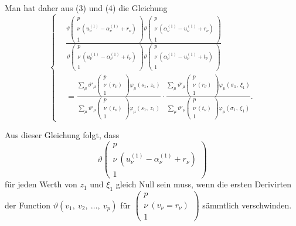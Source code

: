 \documentclass[12pt,a4paper]{book}
\theoremstyle{definition}
\theoremstyle{remark}
\begin{document}
Man hat daher aus (3) und (4) die Gleichung
\begin{equation}
\tag{5}
\left\{
\begin{aligned}
&\frac{\vartheta\left(\begin{array}{c} p\\ \nu\ (u_\nu^{(1)} - \alpha_\nu^{(1)} + r_\nu)\\ 1 \end{array}\right) \vartheta\left(\begin{array}{c} p\\ \nu\ (\alpha_\nu^{(1)} - u_\nu^{(1)} + r_\nu)\\ 1 \end{array}\right)}{\vartheta\left(\begin{array}{c} p\\ \nu\ (u_\nu^{(1)} - \alpha_\nu^{(1)} + t_\nu)\\ 1 \end{array}\right) \vartheta\left(\begin{array}{c} p\\ \nu\ (\alpha_\nu^{(1)} - u_\nu^{(1)} + t_\nu)\\ 1 \end{array}\right)}\\[1ex]
&= \frac{\sum\limits_\mu \vartheta'_\mu\left(\begin{array}{c} p\\ \nu\ (r_\nu)\\ 1 \end{array}\right) \varphi_\mu(s_1,\ z_1)}{\sum\limits_\mu \vartheta'_\mu\left(\begin{array}{c} p\\ \nu\ (t_\nu)\\ 1 \end{array}\right) \varphi_\mu(s_1,\ z_1)} \cdot \frac{\sum\limits_\mu \vartheta'_\mu\left(\begin{array}{c} p\\ \nu\ (r_\nu)\\ 1 \end{array}\right) \varphi_\mu(\sigma_1,\ \xi_1)}{\sum\limits_\mu \vartheta'_\mu\left(\begin{array}{c} p\\ \nu\ (t_\nu)\\ 1 \end{array}\right) \varphi_\mu(\sigma_1,\ \xi_1)}. \end{aligned}
\right.
\end{equation}

Aus dieser Gleichung folgt, dass
\[ \vartheta\left(\begin{array}{c} p\\ \nu\ (u_\nu^{(1)} - \alpha_\nu^{(1)} + r_\nu)\\ 1 \end{array}\right) \]
für jeden Werth von $z_1$ und $\xi_1$ gleich Null sein muss, wenn die ersten Derivirten der Function $\vartheta(v_1,\ v_2,\ \ldots,\ v_p)$ für $\left(\begin{array}{c} p\\ \nu\ (v_\nu = r_\nu)\\ 1 \end{array}\right)$ sämmtlich verschwinden.
\end{document}
